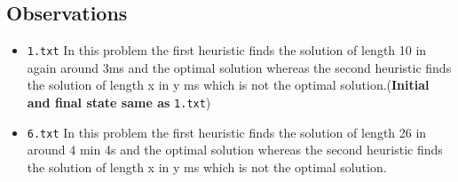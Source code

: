 \documentclass{article}
\begin{document}
\subsection{Observations}
\begin{itemize}
\item \verb|1.txt| In this problem the first heuristic finds the solution of length 10 in again around 3ms and the optimal solution whereas the second heuristic finds the solution of length x in y ms which is not the optimal solution.(\textbf{Initial and final state same as} \verb|1.txt|)

\item \verb|6.txt| In this problem the first heuristic finds the solution of length 26 in around 4 min 4s and the optimal solution whereas the second heuristic finds the solution of length x in y ms which is not the optimal solution.


\end{itemize}
\end{document}

